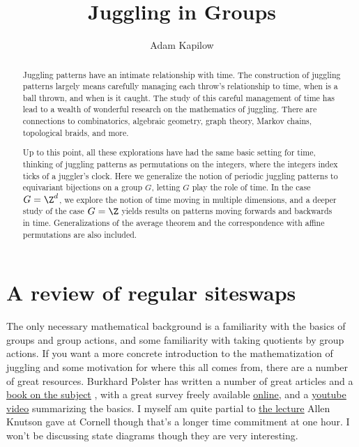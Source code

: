 \documentclass[12nt]{article}
\theoremstyle{plain}
\begin{document}
\title{Juggling in Groups}
\author{Adam Kapilow}
\maketitle

\newpage
\tableofcontents
\newpage

\begin{abstract}
Juggling patterns have an intimate relationship with time. The construction of juggling patterns largely means carefully managing each throw's relationship to time, when is a ball thrown, and when is it caught. The study of this careful management of time has lead to a wealth of wonderful research on the mathematics of juggling. There are connections to combinatorics, algebraic geometry, graph theory, Markov chains, topological braids, and more. 

Up to this point, all these explorations have had the same basic setting for time, thinking of juggling patterns as permutations on the integers, where the integers index ticks of a juggler's clock. Here we generalize the notion of periodic juggling patterns to equivariant bijections on a group $G$, letting $G$ play the role of time. In the case $G = \Z^d$, we explore the notion of time moving in multiple dimensions, and a deeper study of the case $G = \Z$ yields results on patterns moving forwards and backwards in time. Generalizations of the average theorem and the correspondence with affine permutations are also included.
\end{abstract}

\section{A review of regular siteswaps}




The only necessary mathematical background is a familiarity with the basics of groups and group actions, and some familiarity with taking quotients by group actions. If you want a more concrete introduction to the mathematization of juggling and some motivation for where this all comes from, there are a number of great resources. Burkhard Polster has written a number of great articles and a \underline{\textcolor{blue}{\href{https://www.qedcat.com/books.html}{book on the subject}}} \cite{polster_book}, with a great survey freely available \underline{\textcolor{blue}{\href{https://www.qedcat.com/articles/juggling_survey.pdf}{online}}}, and a \underline{\textcolor{blue}{\href{https://youtu.be/VsQ-OPIZ5kg}{youtube video}}} summarizing the basics. I myself am quite partial to \underline{\textcolor{blue}{\href{https://youtu.be/38rf9FLhl-8}{the lecture}}} Allen Knutson gave at Cornell though that's a longer time commitment at one hour. I won't be discussing state diagrams though they are very interesting.
\end{document}
